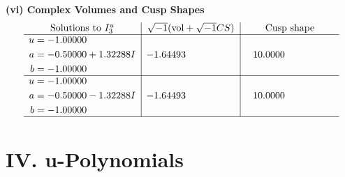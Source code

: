 \documentclass[1p]{elsarticle_modified}
\theoremstyle{definition}
\newcommand{\I}{\sqrt{-1}}
\begin{document}
\newpage\flushleft \textbf{(vi) Complex Volumes and Cusp Shapes}
$$\begin{array}{c|c|c}  
\text{Solutions to }I^u_{3}& \I (\text{vol} + \sqrt{-1}CS) & \text{Cusp shape}\\
 \hline 
\begin{aligned}
u &= -1.00000\phantom{ +0.000000I} \\
a &= -0.50000 + 1.32288 I \\
b &= -1.00000\phantom{ +0.000000I}\end{aligned}
 & -1.64493\phantom{ +0.000000I} & \phantom{-}10.0000\phantom{ +0.000000I} \\ \hline\begin{aligned}
u &= -1.00000\phantom{ +0.000000I} \\
a &= -0.50000 - 1.32288 I \\
b &= -1.00000\phantom{ +0.000000I}\end{aligned}
 & -1.64493\phantom{ +0.000000I} & \phantom{-}10.0000\phantom{ +0.000000I}\\
 \hline 
 \end{array}$$\newpage
\newpage\renewcommand{\arraystretch}{1}
\centering \section*{ IV. u-Polynomials}
\end{document}
